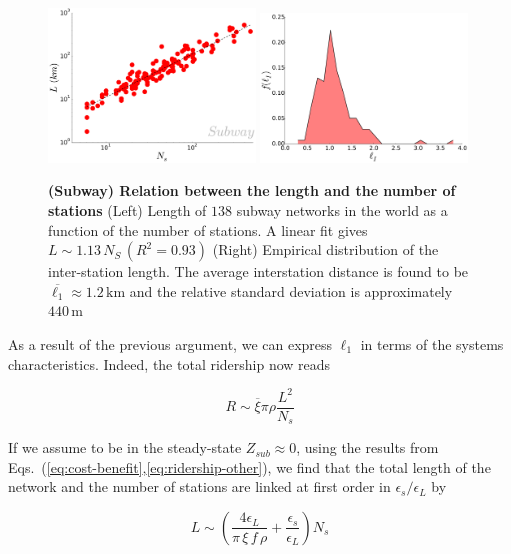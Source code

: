 \begin{figure}
    \centering
    \includegraphics[width=0.49\textwidth]{gfx/chapter-networks/metro_length_stations.pdf}
    \includegraphics[width=0.49\textwidth]{gfx/chapter-networks/metro_hist_ell_1.pdf}
    \caption{{\bf (Subway) Relation between the length and the number of stations} (Left) Length of $138$ subway networks in the world as a function of the number of stations. A linear fit gives $L \sim 1.13\,N_S\,(R^2=0.93)$ (Right) Empirical distribution of the inter-station length. The average interstation distance is found to be $\overline{\ell_1} \approx 1.2\, \text{km}$ and the relative standard deviation is approximately $440\,\text{m}$ \label{fig:metro_length_stations}}
\end{figure}

As a result of the previous argument, we can express $\ell_1$ in terms of the systems characteristics. Indeed, the total ridership now reads

\begin{equation}
    R \sim \overline{\xi}\pi\rho\frac{L^2}{N_s}
    \label{eq:ridership-other}
\end{equation}

If we assume to be in the steady-state $Z_{sub} \approx 0$, using the results from Eqs.~(\ref{eq:cost-benefit},\ref{eq:ridership-other}), we find that the total length of the network and the number of stations are linked at first order in $\epsilon_s/\epsilon_L$ by

\begin{equation}
    L \sim \left( \frac{4 \epsilon_L}{\pi\,\xi\,f\,\rho} + \frac{\epsilon_s}{\epsilon_L}\right) N_s
    \label{eq:length-stations}
\end{equation}

